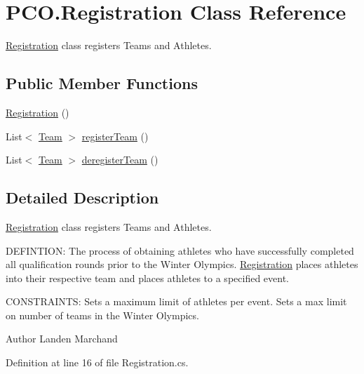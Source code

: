 \hypertarget{classPCO_1_1Registration}{\section{P\+C\+O.\+Registration Class Reference}
\label{classPCO_1_1Registration}
}


\hyperlink{classPCO_1_1Registration}{Registration} class registers Teams and Athletes.  


\subsection*{Public Member Functions}
\begin{DoxyCompactItemize}
\item 
\hyperlink{classPCO_1_1Registration_a74519be4876c47630ca2b5f5084d48eb}{Registration} ()
\item 
List$<$ \hyperlink{classPCO_1_1Team}{Team} $>$ \hyperlink{classPCO_1_1Registration_ab5854210421c2f480d8a50bf87b4e739}{register\+Team} ()
\item 
List$<$ \hyperlink{classPCO_1_1Team}{Team} $>$ \hyperlink{classPCO_1_1Registration_ab574ad030f255cffd60cc6c2dbb0acea}{deregister\+Team} ()
\end{DoxyCompactItemize}


\subsection{Detailed Description}
\hyperlink{classPCO_1_1Registration}{Registration} class registers Teams and Athletes. 

D\+E\+F\+I\+N\+T\+I\+O\+N\+: The process of obtaining athletes who have successfully completed all qualification rounds prior to the Winter Olympics. \hyperlink{classPCO_1_1Registration}{Registration} places athletes into their respective team and places athletes to a specified event.

C\+O\+N\+S\+T\+R\+A\+I\+N\+T\+S\+: Sets a maximum limit of athletes per event. Sets a max limit on number of teams in the Winter Olympics.\begin{DoxyAuthor}{Author}
Landen Marchand 
\end{DoxyAuthor}


Definition at line 16 of file Registration.\+cs.



